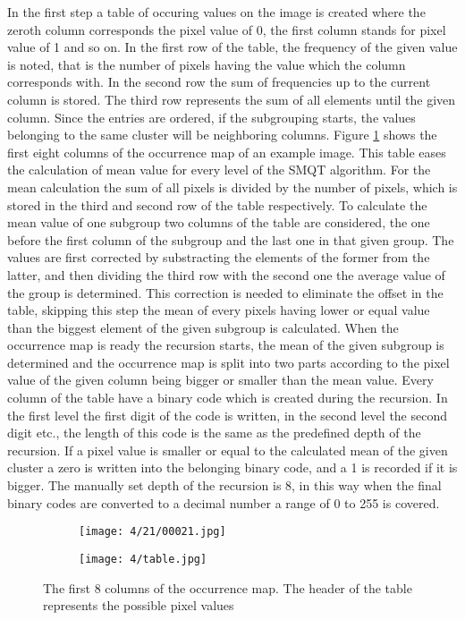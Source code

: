 \documentclass[draft,final]{vutinfth} %
\begin{document}
In the first step a table of occuring values on the image is created where the zeroth column corresponds the pixel value of 0, the first column stands for pixel value of 1 and so on.
In the first row of the table, the frequency of the given value is noted, that is the number of pixels having the value which the column corresponds with.
In the second row the sum of frequencies up to the current column is stored.
The third row represents the sum of all elements until the given column.
Since the entries are ordered, if the subgrouping starts, the values belonging to the same cluster will be neighboring columns.
Figure \ref{fig:fans:table} shows the first eight columns of the occurrence map of an example image.
This table eases the calculation of mean value for every level of the SMQT algorithm.
For the mean calculation the sum of all pixels is divided by the number of pixels, which is stored in the third and second row of the table respectively. 
To calculate the mean value of one subgroup two columns of the table are considered, the one before the first column of the subgroup and the last one in that given group.
The values are first corrected by substracting the elements of the former from the latter, and then dividing the third row with the second one the average value of the group is determined.
This correction is needed to eliminate the offset in the table, skipping this step the mean of every pixels having lower or equal value than the biggest element of the given subgroup is calculated.
When the occurrence map is ready the recursion starts, the mean of the given subgroup is determined and the occurrence map is split into two parts according to the pixel value of the given column being bigger or smaller than the mean value. 
Every column of the table have a binary code which is created during the recursion.
In the first level the first digit of the code is written, in the second level the second digit etc., the length of this code is the same as the predefined depth of the recursion.
If a pixel value is smaller or equal to the calculated mean of the given cluster a zero is written into the belonging binary code, and a 1 is recorded if it is bigger.
The manually set depth of the recursion is 8, in this way when the final binary codes are converted to a decimal number a range of 0 to 255 is covered.
\begin{figure}[h]
  \centering
  \begin{subfigure}[t]{0.09\columnwidth}
    \centering
    \texttt{[image: 4/21/00021.jpg]}
  \end{subfigure}
  \begin{subfigure}[t]{0.9\columnwidth}
    \centering
    \texttt{[image: 4/table.jpg]}
  \end{subfigure}
  \caption{The first 8 columns of the occurrence map. The header of the table represents the possible pixel values }
  \label{fig:fans:table} %
\end{figure}
\end{document}
